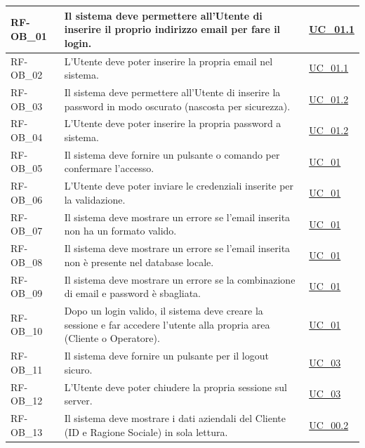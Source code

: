 \begin{longtable}{|>{\raggedright}p{}|>{\raggedright\arraybackslash}p{}|>{\raggedright\arraybackslash}p{}|}
    \hline
    RF-OB\_01 \hypertarget{rf-ob_1} & Il sistema deve permettere all'Utente di inserire il proprio indirizzo email per fare il login. & \hyperref[uc_01.1]{UC\_01.1} \\
    \hline
    RF-OB\_02 \hypertarget{rf-ob_2} & L'Utente deve poter inserire la propria email nel sistema. & \hyperref[uc_01.1]{UC\_01.1} \\
    \hline
    RF-OB\_03 \hypertarget{rf-ob_3} & Il sistema deve permettere all'Utente di inserire la password in modo oscurato (nascosta per sicurezza). & \hyperref[uc_01.2]{UC\_01.2} \\
    \hline
    RF-OB\_04 \hypertarget{rf-ob_4} & L'Utente deve poter inserire la propria password a sistema. & \hyperref[uc_01.2]{UC\_01.2} \\
    \hline
    RF-OB\_05 \hypertarget{rf-ob_5} & Il sistema deve fornire un pulsante o comando per confermare l'accesso. & \hyperref[uc_01]{UC\_01} \\
    \hline
    RF-OB\_06 \hypertarget{rf-ob_6} & L'Utente deve poter inviare le credenziali inserite per la validazione. & \hyperref[uc_01]{UC\_01} \\
    \hline
    RF-OB\_07 \hypertarget{rf-ob_7} & Il sistema deve mostrare un errore se l'email inserita non ha un formato valido. & \hyperref[uc_01]{UC\_01} \\
    \hline
    RF-OB\_08 \hypertarget{rf-ob_8} & Il sistema deve mostrare un errore se l'email inserita non è presente nel database locale. & \hyperref[uc_01]{UC\_01} \\
    \hline
    RF-OB\_09 \hypertarget{rf-ob_9} & Il sistema deve mostrare un errore se la combinazione di email e password è sbagliata. & \hyperref[uc_01]{UC\_01} \\
    \hline
    RF-OB\_10 \hypertarget{rf-ob_10} & Dopo un login valido, il sistema deve creare la sessione e far accedere l'utente alla propria area (Cliente o Operatore). & \hyperref[uc_01]{UC\_01} \\
    \hline
    RF-OB\_11 \hypertarget{rf-ob_11} & Il sistema deve fornire un pulsante per il logout sicuro. & \hyperref[uc_03]{UC\_03} \\
    \hline
    RF-OB\_12 \hypertarget{rf-ob_12} & L'Utente deve poter chiudere la propria sessione sul server. & \hyperref[uc_03]{UC\_03} \\
    \hline
    RF-OB\_13 \hypertarget{rf-ob_13} & Il sistema deve mostrare i dati aziendali del Cliente (ID e Ragione Sociale) in sola lettura. & \hyperref[uc_00.2]{UC\_00.2} \\

\end{longtable}

